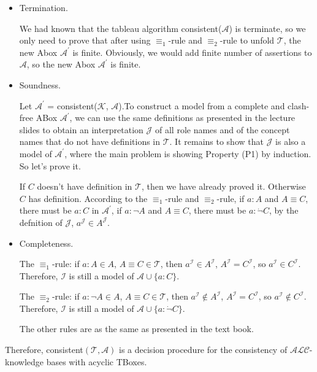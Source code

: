 \documentclass[12pt]{article}
\begin{document}
    \begin{itemize}
        \item Termination. \par
        We had known that the tableau algorithm consistent($\mathcal{A}$) is terminate, so we only need to prove that after using $\equiv_{1}$-rule and $\equiv_{2}$-rule to unfold $\mathcal{T}$, the new Abox $\mathcal{A}^{'}$ is finite. Obviously, we would add finite number of assertions to $\mathcal{A}$, so the new Abox $\mathcal{A}^{'}$ is finite.
        \item Soundness. \par
        Let $\mathcal{A}^{'}$ = consistent($\mathcal{K}$, $\mathcal{A}$).To construct a model from a complete and clash-free ABox $\mathcal{A}^{'}$, we can use the same definitions as presented in the lecture slides to obtain an interpretation $\mathcal{J}$ of all role names and of the concept names that do not have definitions in $\mathcal{T}$. It remains to show that $\mathcal{J}$ is also a model of $\mathcal{A}^{'}$, where the main problem is showing Property (P1) by induction. So let's prove it.\par
        If $C$ doesn't have definition in $\mathcal{T}$, then we have already
        proved it. Otherwise $C$ has definition. According to the $\equiv_{1}$-rule and $\equiv_{2}$-rule, if $a : A$ and $A \equiv C$, there must be $a : C$ in $\mathcal{A}^{'}$, if $a : \neg A$ and $A \equiv C$, there must be $a: \dot{\neg} C$, by the defnition of $\mathcal{J}$, $a^{\mathcal{J}} \in A^{\mathcal{J}}$.
        \item Completeness. \par
        The $\equiv_{1}$-rule: if $a : A \in A$, $A \equiv C \in \mathcal{T}$, then $a^\mathcal{I} \in A^{\mathcal{I}}$, $A^\mathcal{I} = C^{\mathcal{I}}$, so $a^\mathcal{I} \in C^{\mathcal{I}}$. Therefore, $\mathcal{I}$ is still a model of $\mathcal{A} \cup \{a : C\}$.\par
        The $\equiv_{2}$-rule: if $a : \neg A \in A$, $A \equiv C \in \mathcal{T}$, then $a^\mathcal{I} \not \in A^{\mathcal{I}}$, $A^\mathcal{I} = C^{\mathcal{I}}$, so $a^\mathcal{I} \not \in C^{\mathcal{I}}$. Therefore, $\mathcal{I}$ is still a model of $\mathcal{A} \cup \{a : \dot \neg C\}$. \par
        The other rules are as the same as presented in the text book.
    \end{itemize}
    Therefore, consistent$(\mathcal{T} , \mathcal{A})$ is a decision procedure for the consistency of $\mathcal{ALC}$-knowledge bases with acyclic TBoxes.
\end{document}
